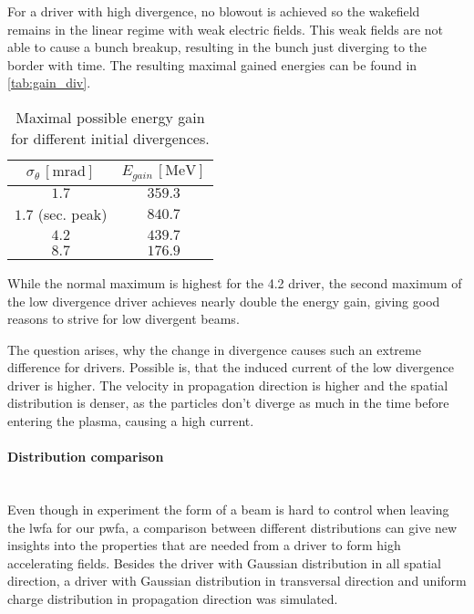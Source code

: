 \documentclass[bachelor_thesis]{subfiles}
\begin{document}
For a driver with high divergence, no blowout is achieved so the wakefield remains in the linear regime with weak electric fields. This weak fields are not able to cause a bunch breakup, resulting in the bunch just diverging to the border with time.
The resulting maximal gained energies can be found in \autoref{tab:gain_div}.
\begin{table}[h]
\begin{center}
\begin{tabular}{|c|c|} 
	\hline
 	$\sigma_{\theta} \, \mathrm{[mrad]}$ & $E_{gain} \, \mathrm{[MeV]}$ \\ 
 	\hline
	$1.7$ & $359.3$ \\ 
	$1.7$ (sec. peak) & $840.7$ \\ 
 	$4.2$ & $439.7$ \\
	$8.7$ & $176.9$ \\
	\hline
\end{tabular}
\caption{Maximal possible energy gain for different initial divergences.}\label{tab:gain_div}
\end{center}
\end{table}
While the normal maximum is highest for the \qty{4.2}{\mrad} driver, the second maximum of the low divergence driver achieves nearly double the energy gain, giving good reasons to strive for low divergent beams.
 
The question arises, why the change in divergence causes such an extreme difference for drivers. Possible is, that the induced current of the low divergence driver is higher. The velocity in propagation direction is higher and the spatial distribution
is denser, as the particles don't diverge as much in the time before entering the plasma, causing a high current. 


\paragraph*{Distribution comparison}\hspace{0pt} \\
Even though in experiment the form of a beam is hard to control when leaving the \gls{lwfa} for our \gls{pwfa}, a comparison between different distributions can give new insights into the properties that are needed from a driver
to form high accelerating fields. Besides the driver with Gaussian distribution in all spatial direction, a driver with Gaussian distribution in transversal direction and uniform charge distribution in propagation direction 
was simulated.
\end{document}
